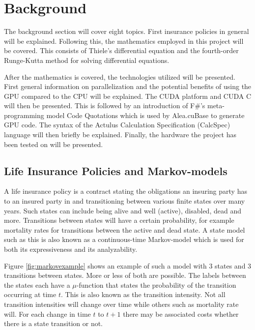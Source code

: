 \section{Background}
The background section will cover eight topics.
First insurance policies in general will be explained.
Following this, the mathematics employed in this project will be covered. 
This consists of Thiele's differential equation and the fourth-order Runge-Kutta method for solving differential equations.

After the mathematics is covered, the technologies utilized will be presented.
First general information on parallelization and the potential benefits of using the GPU compared to the CPU will be explained.
The CUDA platform and CUDA C will then be presented.
This is followed by an introduction of F\#'s meta-programming model Code Quotations which is used by Alea.cuBase to generate GPU code.
The syntax of the Actulus Calculation Specification (CalcSpec) language will then briefly be explained.
Finally, the hardware the project has been tested on will be presented.

\subsection{Life Insurance Policies and Markov-models}
A life insurance policy is a contract stating the obligations an insuring party has to an insured party in and transitioning between various finite states over many years.
Such states can include being alive and well (active), disabled, dead and more.
Transitions between states will have a certain probability, for example mortality rates for transitions between the active and dead state.
A state model such as this is also known as a continuous-time Markov-model which is used for both its expressiveness and its analyzability.

Figure \ref{fig:markovexample} shows an example of such a model with 3 states and 3 transitions between states. More or less of both are possible.
The labels between the states each have a $\mu$-function that states the probability of the transition occurring at time $t$. 
This is also known as the transition intensity.
Not all transition intensities will change over time while others such as mortality rate will.
For each change in time $t$ to $t+1$ there may be associated costs whether there is a state transition or not.

